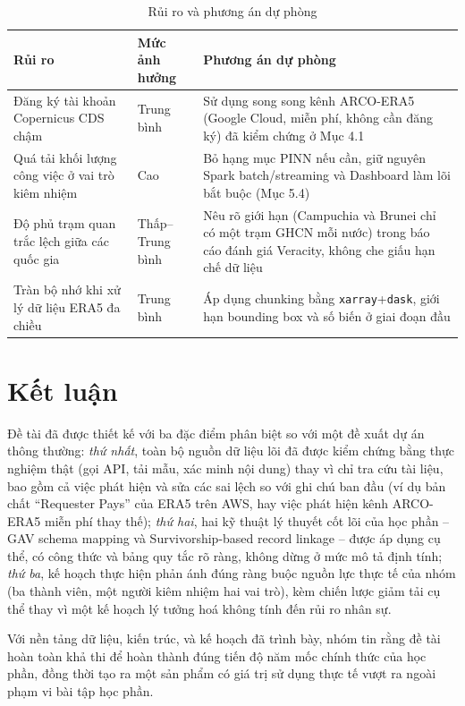 \documentclass[12pt,a4paper]{report}
\begin{document}
\begin{table}[H]
\centering
\caption{Rủi ro và phương án dự phòng}
\label{tab:risks}
\begin{tabular}{@{}L{3.6cm}L{2.2cm}L{6.6cm}@{}}
\toprule
\textbf{Rủi ro} & \textbf{Mức ảnh hưởng} & \textbf{Phương án dự phòng} \\
\midrule
Đăng ký tài khoản Copernicus CDS chậm & Trung bình & Sử dụng song song kênh ARCO-ERA5 (Google Cloud, miễn phí, không cần đăng ký) đã kiểm chứng ở Mục 4.1 \\
Quá tải khối lượng công việc ở vai trò kiêm nhiệm & Cao & Bỏ hạng mục PINN nếu cần, giữ nguyên Spark batch/streaming và Dashboard làm lõi bắt buộc (Mục 5.4) \\
Độ phủ trạm quan trắc lệch giữa các quốc gia & Thấp--Trung bình & Nêu rõ giới hạn (Campuchia và Brunei chỉ có một trạm GHCN mỗi nước) trong báo cáo đánh giá Veracity, không che giấu hạn chế dữ liệu \\
Tràn bộ nhớ khi xử lý dữ liệu ERA5 đa chiều & Trung bình & Áp dụng chunking bằng \texttt{xarray}+\texttt{dask}, giới hạn bounding box và số biến ở giai đoạn đầu \\
\bottomrule
\end{tabular}
\end{table}

\chapter{Kết luận}

Đề tài đã được thiết kế với ba đặc điểm phân biệt so với một đề xuất dự án thông thường: \emph{thứ nhất}, toàn bộ nguồn dữ liệu lõi đã được kiểm chứng bằng thực nghiệm thật (gọi API, tải mẫu, xác minh nội dung) thay vì chỉ tra cứu tài liệu, bao gồm cả việc phát hiện và sửa các sai lệch so với ghi chú ban đầu (ví dụ bản chất ``Requester Pays'' của ERA5 trên AWS, hay việc phát hiện kênh ARCO-ERA5 miễn phí thay thế); \emph{thứ hai}, hai kỹ thuật lý thuyết cốt lõi của học phần -- GAV schema mapping và Survivorship-based record linkage -- được áp dụng cụ thể, có công thức và bảng quy tắc rõ ràng, không dừng ở mức mô tả định tính; \emph{thứ ba}, kế hoạch thực hiện phản ánh đúng ràng buộc nguồn lực thực tế của nhóm (ba thành viên, một người kiêm nhiệm hai vai trò), kèm chiến lược giảm tải cụ thể thay vì một kế hoạch lý tưởng hoá không tính đến rủi ro nhân sự.

Với nền tảng dữ liệu, kiến trúc, và kế hoạch đã trình bày, nhóm tin rằng đề tài hoàn toàn khả thi để hoàn thành đúng tiến độ năm mốc chính thức của học phần, đồng thời tạo ra một sản phẩm có giá trị sử dụng thực tế vượt ra ngoài phạm vi bài tập học phần.
\end{document}
